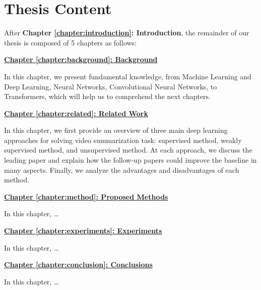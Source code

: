 \section{Thesis Content}
\label{section:intro-content}

    After \textbf{Chapter \ref{chapter:introduction}: Introduction}, the remainder of our thesis is composed of 5 chapters as follows:

    \hyperref[chapter:background]{\textbf{Chapter \ref{chapter:background}: Background}}

        In this chapter, we present fundamental knowledge, from Machine Learning and Deep Learning, Neural Networks, Convolutional Neural Networks, to Transformers, which will help us to comprehend the next chapters.

    \hyperref[chapter:related]{\textbf{Chapter \ref{chapter:related}: Related Work}}

        In this chapter, we first provide an overview of three main deep learning approaches for solving video summarization task: supervised method, weakly supervised method, and unsupervised method. At each approach, we discuss the leading paper and explain how the follow-up papers could improve the baseline in many aspects. Finally, we analyze the advantages and disadvantages of each method. 

    \hyperref[chapter:method]{\textbf{Chapter \ref{chapter:method}: Proposed Methods}}

        In this chapter, \dots

    \hyperref[chapter:experiments]{\textbf{Chapter \ref{chapter:experiments}: Experiments}}

        In this chapter, \dots

    \hyperref[chapter:conclusion]{\textbf{Chapter \ref{chapter:conclusion}: Conclusions}}

        In this chapter, \dots



